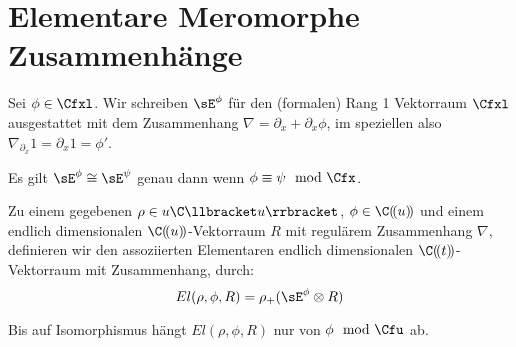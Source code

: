 \chapter{Elementare Meromorphe Zusammenhänge}
\begin{comment}
einführen als Bausteine oder kleinste Meromorphe Zusammenhänge
\end{comment}

\begin{defn}
\cite[1.a]{sabbah_Fourier-local}
Sei $\phi\in\Cfxl$.
Wir schreiben $\sE^\phi$ für den (formalen) Rang 1 Vektorraum $\Cfxl$
ausgestattet mit dem Zusammenhang $\nabla=\partial_x+\partial_x\phi$, im
speziellen also $\nabla_{\partial_x}1=\partial_x1=\phi'$.\\
\begin{comment}
Also
\begin{align*}
\sE^\phi=\Cfxl & \overset{\partial_x}{\rightarrow} \Cfxl\\
1              & \mapsto \phi'(x)\\
f(x)           & \mapsto f'(x)+f(x)\phi'(x)\\
\end{align*}
\end{comment}
\end{defn}

\begin{bem}
\cite[1.a]{sabbah_Fourier-local}
Es gilt $\sE^\phi\cong\sE^\psi$ genau dann wenn $\phi\equiv\psi \mod \Cfx$.
\end{bem}

\begin{defn}
\cite[Def 2.1]{sabbah_Fourier-local}
\begin{comment}
Alternative. ausfürlichere / komplexe definition \cite[Def 5.4.5.]{sabbah_cimpa90}
\end{comment}
Zu einem gegebenen $\rho\in u\C\llbracket u\rrbracket$,
$\phi\in\C(\!(u)\!)$ und einem endlich dimensionalen
$\C(\!(u)\!)$-Vektorraum $R$ mit regulärem Zusammenhang $\nabla$,
definieren wir den assoziierten Elementaren endlich dimensionalen
$\C(\!(t)\!)$-Vektorraum mit Zusammenhang, durch:
\[
El(\rho,\phi,R)=\rho_+(\sE^\phi\otimes R)
\]
\end{defn}
\cite[nach Def 2.1]{sabbah_Fourier-local}
Bis auf Isomorphismus hängt $El(\rho,\phi,R)$ nur von $\phi\mod\Cfu$ ab.
\begin{lem}
\cite[Lem 2.2]{sabbah_Fourier-local}
\end{lem}

